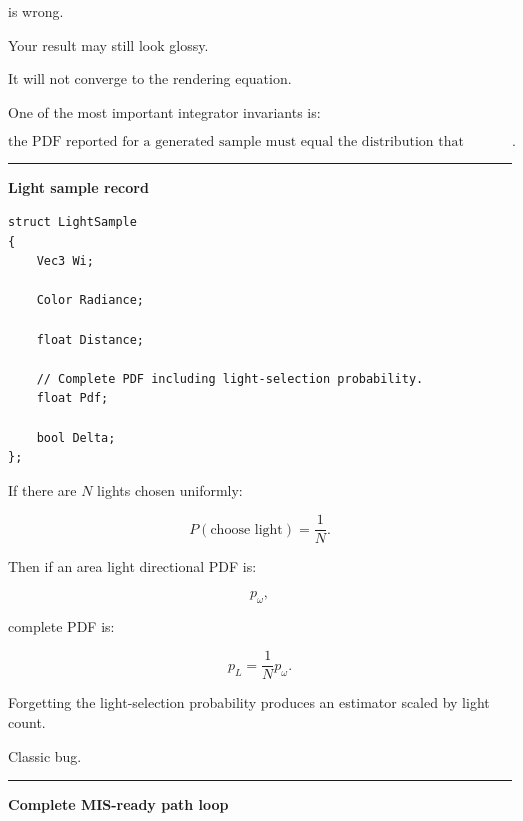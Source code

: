 is wrong.

Your result may still look glossy.

It will not converge to the rendering equation.

One of the most important integrator invariants is:

\[
\boxed{
\text{the PDF reported for a generated sample must equal the distribution that actually generated it}.
}
\]

\begin{center}\rule{0.5\linewidth}{0.5pt}\end{center}

\textbf{Light sample record}

\begin{verbatim}
struct LightSample
{
    Vec3 Wi;

    Color Radiance;

    float Distance;

    // Complete PDF including light-selection probability.
    float Pdf;

    bool Delta;
};
\end{verbatim}

If there are \(N\) lights chosen uniformly:

\[
P(\text{choose light})
=
\frac1N.
\]

Then if an area light directional PDF is:

\[
p_\omega,
\]

complete PDF is:

\[
\boxed{
p_L=
\frac1N p_\omega.
}
\]

Forgetting the light-selection probability produces an estimator scaled by light count.

Classic bug.

\begin{center}\rule{0.5\linewidth}{0.5pt}\end{center}

\textbf{Complete MIS-ready path loop}

